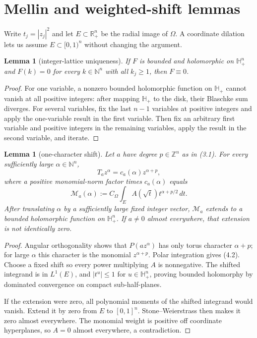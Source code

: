 \documentclass[11pt]{article}
\newtheorem{lemma}[theorem]{Lemma}
\newcommand{\N}{\mathbb N}
\newcommand{\Z}{\mathbb Z}
\newcommand{\Hh}{\mathbb H_+}
\newcommand{\Om}{\Omega}
\begin{document}
\section{Mellin and weighted-shift lemmas}

Write $t_j=|z_j|^2$ and let $E\subset\mathbb R_+^n$ be the radial image of
$\Om$.  A coordinate dilation lets us assume $E\subset[0,1)^n$ without
changing the argument.

\begin{lemma}[integer-lattice uniqueness]\label{lem:lattice}
If $F$ is bounded and holomorphic on $\Hh^n$ and
$F(k)=0$ for every $k\in\N^n$ with all $k_j\ge1$, then $F\equiv0$.
\end{lemma}

\begin{proof}
For one variable, a nonzero bounded holomorphic function on $\Hh$ cannot
vanish at all positive integers: after mapping $\Hh$ to the disk, their
Blaschke sum diverges.  For several variables, fix the last $n-1$ variables
at positive integers and apply the one-variable result in the first
variable.  Then fix an arbitrary first variable and positive integers in the
remaining variables, apply the result in the second variable, and iterate.
\end{proof}

\begin{lemma}[one-character shift]\label{lem:shift}
Let $a$ have degree $p\in\Z^n$ as in (3.1).  For every sufficiently large
$\alpha\in\N^n$,
\[
 T_a z^\alpha=c_a(\alpha)z^{\alpha+p},                \tag{4.1}
\]
where a positive monomial-norm factor times $c_a(\alpha)$ equals
\[
 \mathcal M_a(\alpha)
 :=C_\Om\int_E A(\sqrt t)t^{\alpha+p/2}\,dt.          \tag{4.2}
\]
After translating $\alpha$ by a sufficiently large fixed integer vector,
$\mathcal M_a$ extends to a bounded holomorphic function on $\Hh^n$.  If
$a\ne0$ almost everywhere, that extension is not identically zero.
\end{lemma}

\begin{proof}
Angular orthogonality shows that $P(az^\alpha)$ has only torus character
$\alpha+p$; for large $\alpha$ this character is the monomial
$z^{\alpha+p}$.  Polar integration gives (4.2).  Choose a fixed shift so
every power multiplying $A$ is nonnegative.  The shifted integrand is in
$L^1(E)$, and $|t^u|\le1$ for $u\in\Hh^n$, proving bounded holomorphy by
dominated convergence on compact sub-half-planes.

If the extension were zero, all polynomial moments of the shifted integrand
would vanish.  Extend it by zero from $E$ to $[0,1]^n$.  Stone--Weierstrass
then makes it zero almost everywhere.  The monomial weight is positive off
coordinate hyperplanes, so $A=0$ almost everywhere, a contradiction.
\end{proof}
\end{document}
